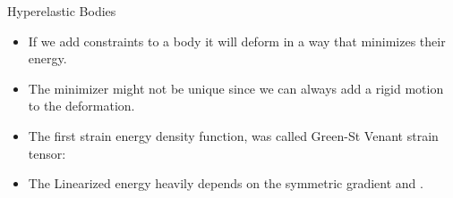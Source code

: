 \documentclass{beamer}
\newcommand{\bul}{{\color{structure}\textbullet}}
\begin{document}
    \begin{frame}{Hyperelastic Bodies}
    \begin{itemize}
        \item[\bul] If we add constraints to a body it will deform in a way that minimizes their energy.
        \vfill
        \item[\bul] The minimizer might not be unique since we can always add a rigid motion to the deformation.
        \vfill\pause
        \item[\bul] The  first strain energy density function, was called Green-St Venant strain tensor:
        \vfill\pause
        \item[\bul] The Linearized energy heavily depends on the symmetric gradient  and \vl{$\Bu= \By-\Bx$}.
    \end{itemize}
    \end{frame}
\end{document}
